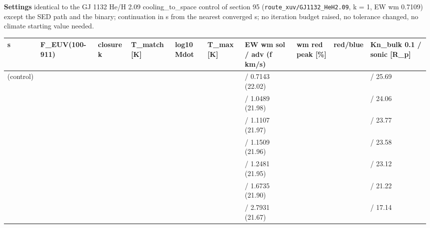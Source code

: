 \documentclass[english,a4paper]{my_memo}
\begin{document}
\textbf{Settings} identical to the GJ 1132 He/H 2.09 cooling\_to\_space control of
section 95 (\texttt{route\_xuv/GJ1132\_HeH2.09}, k = 1, EW wm 0.7109) except the SED
path and the binary; continuation in s from the nearest converged s; no
iteration budget raised, no tolerance changed, no climate starting value
needed.

{\def\LTcaptype{none} %
{\small
\begin{longtable}[]{@{}>{\raggedright\arraybackslash}p{\dimexpr(\linewidth-20\tabcolsep)/10\relax}>{\raggedright\arraybackslash}p{\dimexpr(\linewidth-20\tabcolsep)/10\relax}>{\raggedright\arraybackslash}p{\dimexpr(\linewidth-20\tabcolsep)/10\relax}>{\raggedright\arraybackslash}p{\dimexpr(\linewidth-20\tabcolsep)/10\relax}>{\raggedright\arraybackslash}p{\dimexpr(\linewidth-20\tabcolsep)/10\relax}>{\raggedright\arraybackslash}p{\dimexpr(\linewidth-20\tabcolsep)/10\relax}>{\raggedright\arraybackslash}p{\dimexpr(\linewidth-20\tabcolsep)/10\relax}>{\raggedright\arraybackslash}p{\dimexpr(\linewidth-20\tabcolsep)/10\relax}>{\raggedright\arraybackslash}p{\dimexpr(\linewidth-20\tabcolsep)/10\relax}>{\raggedright\arraybackslash}p{\dimexpr(\linewidth-20\tabcolsep)/10\relax}@{}}
\toprule\noalign{}
s & F\_EUV(100-911) & closure k & T\_match {[}K{]} & log10 Mdot & T\_max {[}K{]} & EW wm sol / adv (f km/s) & wm red peak {[}\%{]} & red/blue & Kn\_bulk 0.1 / sonic {[}R\_p{]} \\
\midrule\noalign{}
\endhead
\bottomrule\noalign{}
\endlastfoot
1 (control) & 10.05 & 1 & 350.71 & 7.8864 & 4961 & 0.7109 / 0.7143 (22.02) & 0.821 & 7.60 & 5.70 / 25.69 \\
1.3 & 13.07 & 1 & 350.29 & 8.0399 & 5212 & 1.0452 / 1.0489 (21.98) & 1.207 & 7.52 & 6.06 / 24.06 \\
1.36 & 13.67 & 1 & 350.39 & 8.0652 & 5250 & 1.1071 / 1.1107 (21.97) & 1.278 & 7.51 & 6.12 / 23.77 \\
1.4 & 14.07 & 1 & 350.31 & 8.0812 & 5274 & 1.1472 / 1.1509 (21.96) & 1.325 & 7.50 & 6.16 / 23.58 \\
1.5 & 15.08 & 1 & 349.95 & 8.1188 & 5329 & 1.2444 / 1.2481 (21.95) & 1.437 & 7.49 & 6.25 / 23.12 \\
2 & 20.10 & 3 & 345.81 & 8.2691 & 5531 & 1.6703 / 1.6735 (21.90) & 1.928 & 7.42 & 6.64 / 21.22 \\
4 & 40.20 & 3 & 339.95 & 8.6069 & 5894 & 2.7923 / 2.7931 (21.67) & 3.222 & 7.29 & 7.85 / 17.14 \\
\end{longtable}
}
}
\end{document}
